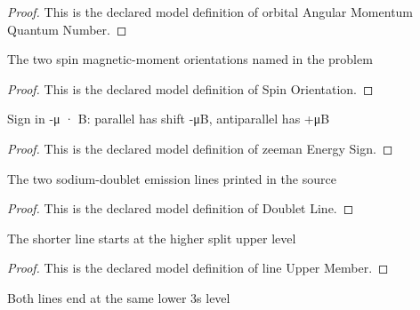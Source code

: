 \begin{proof}
  This is the declared model definition of orbital Angular Momentum Quantum Number.
\end{proof}
\begin{definition}
  \label{def:physics:phyx-mini-0578:phyxminiproblems-problemphyxmini0578-spinorientation}
  The two spin magnetic-moment orientations named in the problem
\end{definition}
\begin{proof}
  This is the declared model definition of Spin Orientation.
\end{proof}
\begin{definition}
  \label{def:physics:phyx-mini-0578:phyxminiproblems-problemphyxmini0578-zeemanenergysign}
  Sign in -μ · B: parallel has shift -μB, antiparallel has +μB
\end{definition}
\begin{proof}
  This is the declared model definition of zeeman Energy Sign.
\end{proof}
\begin{definition}
  \label{def:physics:phyx-mini-0578:phyxminiproblems-problemphyxmini0578-doubletline}
  The two sodium-doublet emission lines printed in the source
\end{definition}
\begin{proof}
  This is the declared model definition of Doublet Line.
\end{proof}
\begin{definition}
  \label{def:physics:phyx-mini-0578:phyxminiproblems-problemphyxmini0578-lineuppermember}
  The shorter line starts at the higher split upper level
\end{definition}
\begin{proof}
  This is the declared model definition of line Upper Member.
\end{proof}
\begin{definition}
  \label{def:physics:phyx-mini-0578:phyxminiproblems-problemphyxmini0578-linelowerlevel}
  Both lines end at the same lower 3s level
\end{definition}
